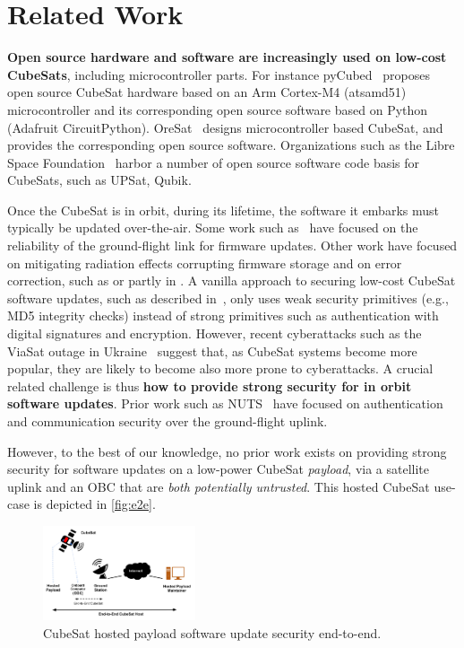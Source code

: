 \section{Related Work}
\label{sec:background-related-work}

{\bf Open source hardware and software are increasingly used on low-cost CubeSats}, including microcontroller parts.
For instance pyCubed~\cite{Holliday2019PyCubed} proposes open source CubeSat hardware based on an Arm Cortex-M4 (atsamd51)
microcontroller and its corresponding open source software based on Python (Adafruit CircuitPython).
OreSat~\cite{spivey2021oresat} designs microcontroller based CubeSat, and provides the corresponding open source software.
Organizations such as the Libre Space Foundation~\cite{librespace} harbor a number of open source software code basis for
CubeSats, such as UPSat, Qubik.

Once the CubeSat is in orbit, during its lifetime, the software it embarks must typically be updated over-the-air.
Some work such as~\cite{FitzsimmonsReliableSoftwareUpdates} have focused on the reliability of the ground-flight link for firmware updates.
Other work have focused on mitigating radiation effects corrupting firmware storage and on error correction, such as \cite{yuen2019low}
or partly in \cite{sunter2016updatesnano}.
A vanilla approach to securing low-cost CubeSat software updates, such as described in~\cite{maison2021otaeducubesat},
only uses weak security primitives (e.g., MD5 integrity checks) instead of strong primitives such as authentication
with digital signatures and encryption.
However, recent cyberattacks such as the ViaSat outage in Ukraine~\cite{viasat-cyberattack} suggest that, as CubeSat
systems become more popular, they are likely to become also more prone to cyberattacks.
A crucial related challenge is thus {\bf how to provide strong security for in orbit software updates}.
Prior work such as NUTS~\cite{birkeland2014nutsoverview,bezem2013nutsAuthenticatedUplink} have focused on authentication
and communication security over the ground-flight uplink.

However, to the best of our knowledge, no prior work exists on providing strong security for software updates on a low-power
CubeSat \textit{payload}, via a satellite uplink and an OBC that are \textit{both potentially untrusted}.
This hosted CubeSat use-case is depicted in \autoref{fig:e2e}.

\begin{figure}[t]
    \centering
    \includegraphics[width=0.4\textwidth]{Figures/CubeSat-Payload-End2End.png}
    \caption{CubeSat hosted payload software update security end-to-end.}
    \label{fig:e2e}
\end{figure}

